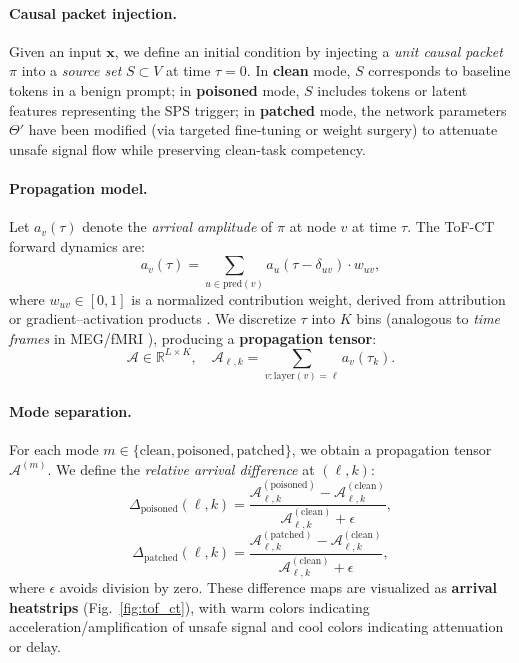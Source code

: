 \documentclass[11pt]{article}
\begin{document}
\paragraph{Causal packet injection.}  
Given an input $\mathbf{x}$, we define an initial condition by injecting a \emph{unit causal packet} $\pi$ into a \emph{source set} $S \subset V$ at time $\tau=0$.  
In \textbf{clean} mode, $S$ corresponds to baseline tokens in a benign prompt;  
in \textbf{poisoned} mode, $S$ includes tokens or latent features representing the SPS trigger;  
in \textbf{patched} mode, the network parameters $\Theta'$ have been modified (via targeted fine-tuning or weight surgery) to attenuate unsafe signal flow while preserving clean-task competency.

\paragraph{Propagation model.}  
Let $a_v(\tau)$ denote the \emph{arrival amplitude} of $\pi$ at node $v$ at time $\tau$.  
The ToF-CT forward dynamics are:
\[
a_v(\tau) = \sum_{u \in \mathrm{pred}(v)} a_u(\tau - \delta_{uv}) \cdot w_{uv},
\]
where $w_{uv} \in [0,1]$ is a normalized contribution weight, derived from attribution or gradient–activation products \citep{dhamdhere2019dagshapley, elhage2021mathematical}.  
We discretize $\tau$ into $K$ bins (analogous to \emph{time frames} in MEG/fMRI \citep{baillet2001electromagnetic}), producing a \textbf{propagation tensor}:
\[
\mathcal{A} \in \mathbb{R}^{L \times K}, \quad \mathcal{A}_{\ell,k} = \sum_{v: \mathrm{layer}(v)=\ell} a_v(\tau_k).
\]

\paragraph{Mode separation.}  
For each mode $m \in \{\mathrm{clean}, \mathrm{poisoned}, \mathrm{patched}\}$, we obtain a propagation tensor $\mathcal{A}^{(m)}$.  
We define the \emph{relative arrival difference} at $(\ell,k)$:
\[
\Delta_{\mathrm{poisoned}}(\ell,k) = \frac{\mathcal{A}^{(\mathrm{poisoned})}_{\ell,k} - \mathcal{A}^{(\mathrm{clean})}_{\ell,k}}{\mathcal{A}^{(\mathrm{clean})}_{\ell,k} + \epsilon},
\]
\[
\Delta_{\mathrm{patched}}(\ell,k) = \frac{\mathcal{A}^{(\mathrm{patched})}_{\ell,k} - \mathcal{A}^{(\mathrm{clean})}_{\ell,k}}{\mathcal{A}^{(\mathrm{clean})}_{\ell,k} + \epsilon},
\]
where $\epsilon$ avoids division by zero.  
These difference maps are visualized as \textbf{arrival heatstrips} (Fig.~\ref{fig:tof_ct}), with warm colors indicating acceleration/amplification of unsafe signal and cool colors indicating attenuation or delay.
\end{document}

